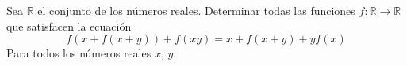 Sea $\mathbb{R}$ el conjunto de los números reales. Determinar todas las funciones $f : \mathbb{R} \to \mathbb{R}$ que satisfacen la ecuación
\[f\left(x+f(x+y)\right)+f(xy)=x+f(x+y)+yf(x)\]
Para todos los números reales $x$, $y$.